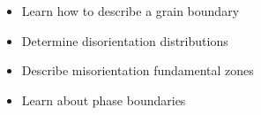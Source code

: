 \begin{learningobjectives}
{\begin{itemize}
    \item[{\color{OCBurntOrange}\ref{\chabbr:sec:GBgeometry}:}] Learn how to describe a grain boundary
    \item[{\color{OCBurntOrange}\ref{\chabbr:sec:MacKenzie}:}] Determine disorientation distributions
    \item[{\color{OCBurntOrange}\ref{\chabbr:sec:MFZs}:}] Describe misorientation fundamental zones
    \item[{\color{OCBurntOrange}\ref{\chabbr:sec:twophases}:}] Learn about phase boundaries
\end{itemize}}
\end{learningobjectives}


